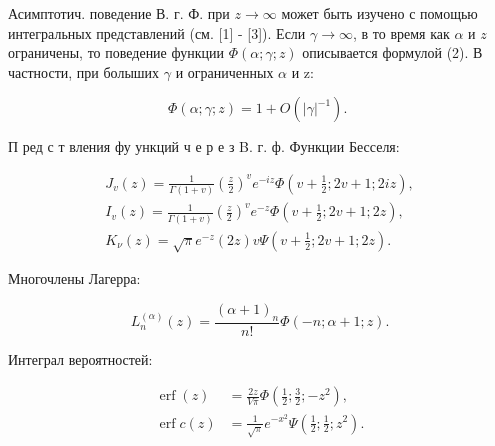 \documentclass[10pt]{article}
\begin{document}
Асимптотич. поведение В. г. Ф. при $z \rightarrow \infty$ может быть изучено с помощью интегральных представлений (см. [1] - [3]). Если $\gamma \rightarrow \infty$, в то время как $\alpha$ и $z$ ограничены, то поведение функции $\Phi(\alpha ; \gamma ; z)$ описывается формулой (2). В частности, при болыших $\gamma$ и ограниченных $\alpha$ и z:



\[

\Phi(\alpha ; \gamma ; z)=1+O\left(|\gamma|^{-1}\right) \text {. }

\]



П ред с т вления фу ункций ч е р е з B. г. ф. Функции Бесселя:



\[

\begin{gathered}

J_{v}(z)=\frac{1}{\Gamma(1+v)}\left(\frac{z}{2}\right)^{v} e^{-i z} \Phi\left(v+\frac{1}{2} ; 2 v+1 ; 2 i z\right), \\

I_{v}(z)=\frac{1}{\Gamma(1+v)}\left(\frac{z}{2}\right)^{v} e^{-z} \Phi\left(v+\frac{1}{2} ; 2 v+1 ; 2 z\right), \\

K_{\nu}(z)=\sqrt{\pi} e^{-z}(2 z) v \Psi\left(v+\frac{1}{2} ; 2 v+1 ; 2 z\right) .

\end{gathered}

\]



Многочлены Лагерра:



\[

L_{n}^{(\alpha)}(z)=\frac{(\alpha+1)_{n}}{n !} \Phi(-n ; \alpha+1 ; z) .

\]



Интеграл вероятностей:



\[

\begin{aligned}

\operatorname{erf}(z) & =\frac{2 z}{V \bar{\pi}} \Phi\left(\frac{1}{2} ; \frac{3}{2} ;-z^{2}\right), \\

\operatorname{erf} c(z) & =\frac{1}{\sqrt{\pi}} e^{-x^{2}} \Psi\left(\frac{1}{2} ; \frac{1}{2} ; z^{2}\right) .

\end{aligned}

\]
\end{document}

